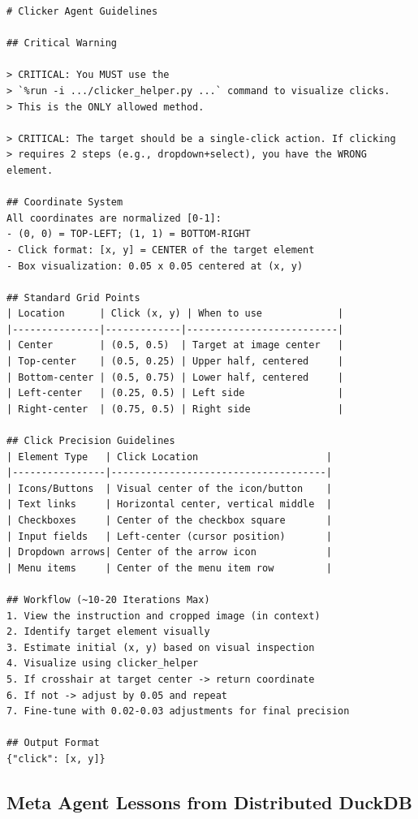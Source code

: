 \begin{listing}[H]
{\tiny
\begin{lstlisting}
# Clicker Agent Guidelines

## Critical Warning

> CRITICAL: You MUST use the
> `%run -i .../clicker_helper.py ...` command to visualize clicks.
> This is the ONLY allowed method.

> CRITICAL: The target should be a single-click action. If clicking
> requires 2 steps (e.g., dropdown+select), you have the WRONG element.

## Coordinate System
All coordinates are normalized [0-1]:
- (0, 0) = TOP-LEFT; (1, 1) = BOTTOM-RIGHT
- Click format: [x, y] = CENTER of the target element
- Box visualization: 0.05 x 0.05 centered at (x, y)

## Standard Grid Points
| Location      | Click (x, y) | When to use             |
|---------------|-------------|--------------------------|
| Center        | (0.5, 0.5)  | Target at image center   |
| Top-center    | (0.5, 0.25) | Upper half, centered     |
| Bottom-center | (0.5, 0.75) | Lower half, centered     |
| Left-center   | (0.25, 0.5) | Left side                |
| Right-center  | (0.75, 0.5) | Right side               |

## Click Precision Guidelines
| Element Type   | Click Location                      |
|----------------|-------------------------------------|
| Icons/Buttons  | Visual center of the icon/button    |
| Text links     | Horizontal center, vertical middle  |
| Checkboxes     | Center of the checkbox square       |
| Input fields   | Left-center (cursor position)       |
| Dropdown arrows| Center of the arrow icon            |
| Menu items     | Center of the menu item row         |

## Workflow (~10-20 Iterations Max)
1. View the instruction and cropped image (in context)
2. Identify target element visually
3. Estimate initial (x, y) based on visual inspection
4. Visualize using clicker_helper
5. If crosshair at target center -> return coordinate
6. If not -> adjust by 0.05 and repeat
7. Fine-tune with 0.02-0.03 adjustments for final precision

## Output Format
{"click": [x, y]}
\end{lstlisting}
}
\caption{ScreenSpot-Pro clicker agent ontology (condensed for space).}
\label{lst:clicker_spec}
\end{listing}

\subsection{Meta Agent Lessons from Distributed DuckDB}
\label{sec:app_duckdb}

